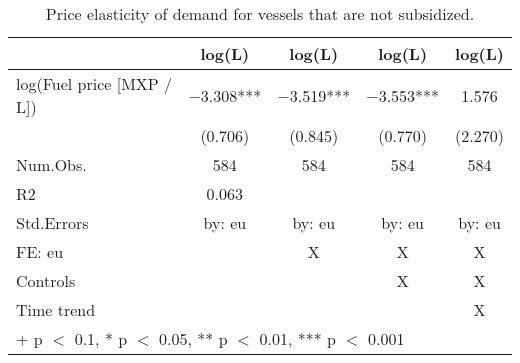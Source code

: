 \begin{table}

\caption{\label{tab:}Price elasticity of demand for vessels that are not subsidized.}
\centering
\begin{tabular}[t]{lcccc}
\toprule
  & log(L) & log(L)  & log(L)   & log(L)   \\
\midrule
log(Fuel price [MXP / L]) & \num{-3.308}*** & \num{-3.519}*** & \num{-3.553}*** & \num{1.576}\\
 & (\num{0.706}) & (\num{0.845}) & (\num{0.770}) & (\num{2.270})\\
\midrule
Num.Obs. & \num{584} & \num{584} & \num{584} & \num{584}\\
R2 & \num{0.063} &  &  & \\
Std.Errors & by: eu & by: eu & by: eu & by: eu\\
FE: eu &  & X & X & X\\
Controls &  &  & X & X\\
Time trend &  &  &  & X\\
\bottomrule
\multicolumn{5}{l}{\rule{0pt}{1em}+ p $<$ 0.1, * p $<$ 0.05, ** p $<$ 0.01, *** p $<$ 0.001}\\
\end{tabular}
\end{table}
